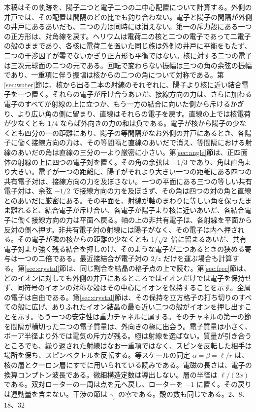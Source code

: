 \documentclass[a4paper]{article}
\begin{document}
本稿はその軌跡を、陽子二つと電子二つの二中心配置について計算する。外側の井戸では、その配置は間隔のどの比でも釣り合わない。電子と陽子の間隔が外側の井戸にあるあいだも、二つの力は同時には消えない。第一の斥力殻にある一つの正方形は、対角線を戻す。ヘリウムは電荷二の核と二つの電子であって二電子の殻のままであり、各核に電荷二を置いた同じ族は外側の井戸に平衡をもたず、二つの干渉因子が零でないかぎり正方形も平衡ではない。核に対する二つの電子は三次元球面の二つの元である。回転で変わらない振幅は三つの角の余弦の振幅であり、一重項に伴う振幅は核からの二つの角について対称である。第\ref{sec:water}節は、核から出る二本の射線のそれぞれに、陽子より核に近い結合電子を一つ置く。それらの電子が斥け合うあいだ、接線方向の力は、さらに加わる電子のすべてが射線の上に立つか、もう一方の結合に向いた側から斥けるかぎり、より広い角の側に留まり、直線はそれらの電子を戻す。直線の上では核電荷が少なくとも \(1/4\) ならば外向きの力の和は負である。電子が核から陽子の少なくとも四分の一の距離にあり、陽子の等間隔がなお外側の井戸にあるとき、各陽子に働く接線方向の力は、その等間隔と直線のあいだで消え、等間隔における射線のあいだの角は直線の三分の一より厳密に小さい。第\ref{sec:angle}節は、正四面体の射線の上に四つの電子対を置く。その角の余弦は \(-1/3\) であり、角は直角より大きい。電子が一つの距離に、陽子がそれより大きい一つの距離にある四つの共有電子対は、接線方向の力を及ぼさない。一つの平面にある三つの等しい共有電子対は、余弦 \(-1/2\) で接線方向の力を及ぼさず、その角は四つの対の角と直線とのあいだに厳密にある。その平面を、射線が軸のまわりに等しい角を保ったまま離れると、結合電子が斥け合い、各電子が陽子より核に近いあいだ、各結合電子に働く接線方向の力は平面へ戻る。軸の上の非共有電子は、各射線を平面から反対の側へ押す。非共有電子対の射線には陽子がなく、その電子は内へ押される。その電子が隣の核からの距離の少なくとも \(1/\sqrt{2}\) 倍に留まるあいだ、共有電子対より強く残る結合を押しのけ、そのような電子が二つあるときの狭める寄与は一つの二倍である。最近接結合が電子対の \(2/z\) だけを運ぶ場合も計算する。第\ref{sec:crystal}節は、同じ割合を結晶の格子点の上で読む。第\ref{sec:free}節は、どのイオンに対しても外側の井戸にあるところではイオンだけでは電子を保持せず、同符号のイオンの対称な殻はその中心にイオンを保持することを示す。金属の電子は自由である。第\ref{sec:crystal}節は、その保持を立方格子の打ち切りのすべての殻に広げ、ありふれたイオン結晶の最も近い二つの殻がイオンを押し出すことを示す。もう一つの安定性は重力チャネルに属する。そのチャネルの第一の節を間隔が横切った二つの電子質量は、外向きの極に出会う。電子質量は小さく、ボーア半径より外では電気の斥力が残る。極は射線を選ばない。質量が引き合うところでも、繰り返された射線はなお一重項ではなく、スピンを反転した相手は場所を保ち、スピンベクトルを反転する。等スケールの同定 \(\alpha=\beta=\ell/r\) は、核の層とクーロン層にすでに用いられている読みである。電磁の長さは、電子の換算コンプトン波長である。微細構造定数は導出しない。層の半径は \(\ell/(2x)\) である。双対ローターの一周は点を元へ戻し、ローターを \(-1\) に置く。その戻りは運動量を含まない。干渉の節は \(\gamma_s\) の零である。殻の数も同じである。\(2\)、\(8\)、\(18\)、\(32\) 
\end{document}
